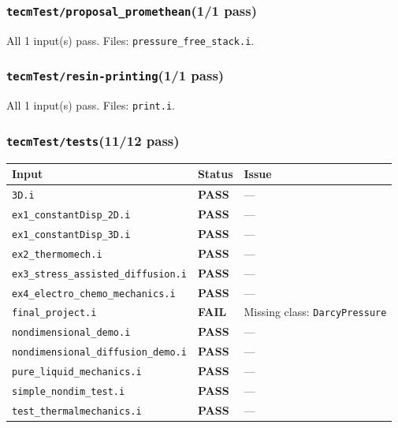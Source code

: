 \documentclass[10pt,letterpaper]{article}
\newcommand{\PASS}{\textcolor{passgreen}{\textbf{PASS}}}
\newcommand{\FAIL}{\textcolor{failred}{\textbf{FAIL}}}
\newcommand{\code}[1]{\texttt{\small #1}}
\begin{document}
\subsubsection{\code{tecmTest/proposal\_promethean}\hfill (1/1 pass)}
All 1 input(s) pass. Files: \code{pressure\_free\_stack.i}.

\subsubsection{\code{tecmTest/resin-printing}\hfill (1/1 pass)}
All 1 input(s) pass. Files: \code{print.i}.

\subsubsection{\code{tecmTest/tests}\hfill (11/12 pass)}
\begin{longtable}{p{} l p{}}
\toprule
Input & Status & Issue \\
\midrule
\endhead
\code{3D.i} & \PASS & --- \\
\code{ex1\_constantDisp\_2D.i} & \PASS & --- \\
\code{ex1\_constantDisp\_3D.i} & \PASS & --- \\
\code{ex2\_thermomech.i} & \PASS & --- \\
\code{ex3\_stress\_assisted\_diffusion.i} & \PASS & --- \\
\code{ex4\_electro\_chemo\_mechanics.i} & \PASS & --- \\
\code{final\_project.i} & \FAIL & Missing class: \code{DarcyPressure} \\
\code{nondimensional\_demo.i} & \PASS & --- \\
\code{nondimensional\_diffusion\_demo.i} & \PASS & --- \\
\code{pure\_liquid\_mechanics.i} & \PASS & --- \\
\code{simple\_nondim\_test.i} & \PASS & --- \\
\code{test\_thermalmechanics.i} & \PASS & --- \\
\bottomrule
\end{longtable}
\end{document}
